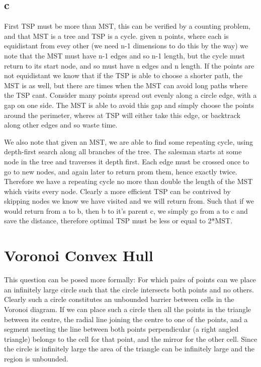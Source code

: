 \documentclass{article}
\begin{document}
\subsection*{c}
First TSP must be more than MST, this can be verified by a counting problem, and that MST is a tree and TSP is a cycle.
given n points, where each is equidistant from evey other (we need n-1 dimensions to do this by the way) we note that the MST must have n-1 edges and so n-1 length, but the cycle must return to its start node, and so must have n edges and n length.
If the points are not equidistant we know that if the TSP is able to choose a shorter path, the MST is as well, but there are times when the MST can avoid long paths where the TSP cant.
Consider many points spread out evenly along a circle edge, with a gap on one side.
The MST is able to avoid this gap and simply choose the points around the perimeter, wheres at TSP will either take this edge, or backtrack along other edges and so waste time.

We also note that given an MST, we are able to find some repeating cycle, using depth-first search along all branches of the tree.
The salesman starts at some node in the tree and traverses it depth first.
Each edge must be crossed once to go to new nodes, and again later to return prom them, hence exactly twice.
Therefore we have a repeating cycle no more than double the length of the MST which visits every node.
Clearly a more efficient TSP can be contrived by skipping nodes we know we have visited and we will return from.
Such that if we would return from a to b, then b to it's parent c, we simply go from a to c and save the distance, therefore optimal TSP must be less or equal to 2*MST.

\section {Voronoi Convex Hull}

This question can be posed more formally: For which pairs of points can we place an infinitely large circle such that the circle intersects both points and no others.
Clearly such a circle constitutes an unbounded barrier between cells in the Voronoi diagram.
If we can place such a circle then all the points in the triangle between its centre, the radial line joining the centre to one of the points, and a segment meeting the line between both points perpendicular (a right angled triangle) belongs to the cell for that point, and the mirror for the other cell.
Since the circle is infinitely large the area of the triangle can be infinitely large and the region is unbounded.
\end{document}
